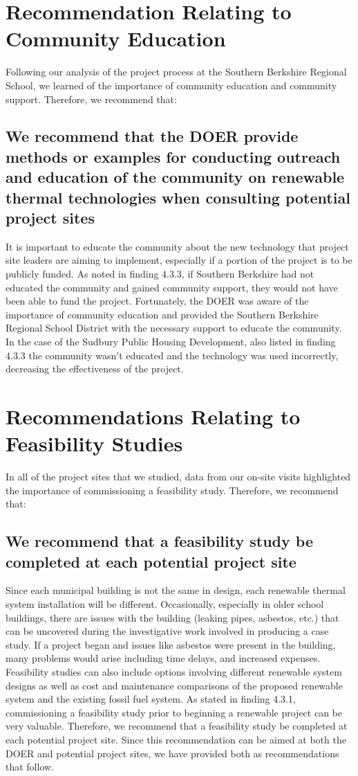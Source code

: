 \section{Recommendation Relating to Community Education}
\par Following our analysis of the project process at the Southern Berkshire Regional School, we learned of the importance of community education and community support. Therefore, we recommend that:
\subsection{We recommend that the DOER provide methods or examples for conducting outreach and education of the community on renewable thermal technologies when consulting potential project sites}
It is important to educate the community about the new technology that project site leaders are aiming to implement, especially if a portion of the project is to be publicly funded. As noted in finding 4.3.3, if Southern Berkshire had not educated the community and gained community support, they would not have been able to fund the project. Fortunately, the DOER was aware of the importance of community education and provided the Southern Berkshire Regional School District with the necessary support to educate the community. In the case of the Sudbury Public Housing Development, also listed in finding 4.3.3 the community wasn't educated and the technology was used incorrectly, decreasing the effectiveness of the project. 

\section{Recommendations Relating to Feasibility Studies}
\par In all of the project sites that we studied, data from our on-site visits highlighted the importance of commissioning a feasibility study. Therefore, we recommend that:
\subsection{We recommend that a feasibility study be completed at each potential project site}
\par Since each municipal building is not the same in design, each renewable thermal system installation will be different. Occasionally, especially in older school buildings, there are issues with the building (leaking pipes, asbestos, etc.) that can be uncovered during the investigative work involved in producing a case study. If a project began and issues like asbestos were present in the building, many problems would arise including time delays, and increased expenses. Feasibility studies can also include options involving different renewable system designs as well as cost and maintenance comparisons of the proposed renewable system and the existing fossil fuel system. As stated in finding 4.3.1, commissioning a feasibility study prior to beginning a renewable project can be very valuable. Therefore, we recommend that a feasibility study be completed at each potential project site. Since this recommendation can be aimed at both the DOER and potential project sites, we have provided both as recommendations that follow.

